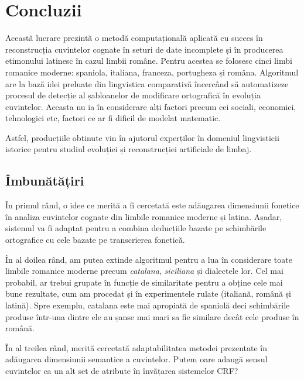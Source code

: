 \chapter{Concluzii}
Această lucrare prezintă o metodă computațională aplicată cu succes în reconstrucția cuvintelor 
cognate în seturi de date incomplete și în producerea etimonului latinesc în cazul limbii române.
Pentru acestea se folosesc cinci limbi romanice moderne: spaniola, italiana, franceza, portugheza
și româna. Algoritmul are la bază idei preluate din lingvistica comparativă încercând să automatizeze
procesul de detecție al șabloanelor de modificare ortografică în evoluția cuvintelor. Aceasta nu ia
în considerare alți factori precum cei sociali, economici, tehnologici etc, factori ce ar fi dificil
de modelat matematic.

Astfel, producțiile obținute vin în ajutorul experților în domeniul lingvisticii istorice pentru
studiul evoluției și reconstrucției artificiale de limbaj.

\section{Îmbunătățiri}
În primul rând, o idee ce merită a fi cercetată este adăugarea dimensiunii fonetice în analiza 
cuvintelor cognate din limbile romanice moderne și latina. Așadar, sistemul va fi adaptat pentru a 
combina deducțiile bazate pe schimbările ortografice cu cele bazate pe transcrierea fonetică.

În al doilea rând, am putea extinde algoritmul pentru a lua în considerare toate limbile romanice
moderne precum \textit{catalana}, \textit{siciliana} și dialectele lor. Cel mai probabil, ar trebui
grupate în funcție de similaritate pentru a obține cele mai bune rezultate, cum am procedat și în 
experimentele rulate (italiană, română și latină). Spre exemplu, catalana este mai apropiată de 
spaniolă deci schimbările produse într-una dintre ele au șanse mai mari sa fie similare decât
cele produse în română.

În al treilea rând, merită cercetată adaptabilitatea metodei prezentate în adăugarea dimensiunii 
semantice a cuvintelor. Putem oare adaugă sensul cuvintelor ca un alt set de atribute în învățarea
sistemelor CRF?


